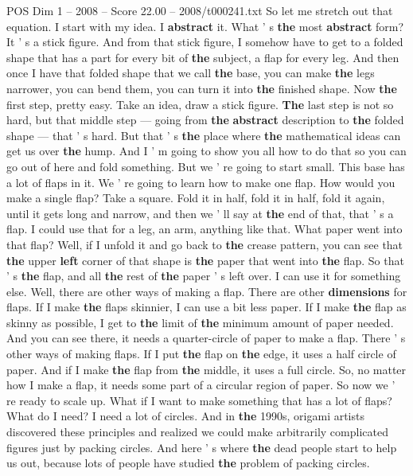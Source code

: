 \begin{textsample}{POS Dim 1 – 2008 – Score 22.00 – 2008/t000241.txt}
So let me stretch out that equation.
I start with my idea.
I \textbf{abstract} it.
What ' s \textbf{the} most \textbf{abstract} form?
It ' s a stick figure.
And from that stick figure, I somehow have to get to a folded shape that has a part for every bit of \textbf{the} subject, a flap for every leg.
And then once I have that folded shape that we call \textbf{the} base, you can make \textbf{the} legs narrower, you can bend them, you can turn it into \textbf{the} finished shape.
Now \textbf{the} first step, pretty easy.
Take an idea, draw a stick figure. \textbf{The} last step is not so hard, but that middle step — going from \textbf{the} \textbf{abstract} description to \textbf{the} folded shape — that ' s hard.
But that ' s \textbf{the} place where \textbf{the} mathematical ideas can get us over \textbf{the} hump.
And I ' m going to show you all how to do that so you can go out of here and fold something.
But we ' re going to start small.
This base has a lot of flaps in it.
We ' re going to learn how to make one flap.
How would you make a single flap?
Take a square.
Fold it in half, fold it in half, fold it again, until it gets long and narrow, and then we ' ll say at \textbf{the} end of that, that ' s a flap.
I could use that for a leg, an arm, anything like that.
What paper went into that flap?
Well, if I unfold it and go back to \textbf{the} crease pattern, you can see that \textbf{the} upper \textbf{left} corner of that shape is \textbf{the} paper that went into \textbf{the} flap.
So that ' s \textbf{the} flap, and all \textbf{the} rest of \textbf{the} paper ' s left over.
I can use it for something else.
Well, there are other ways of making a flap.
There are other \textbf{dimensions} for flaps.
If I make \textbf{the} flaps skinnier, I can use a bit less paper.
If I make \textbf{the} flap as skinny as possible, I get to \textbf{the} limit of \textbf{the} minimum amount of paper needed.
And you can see there, it needs a quarter-circle of paper to make a flap.
There ' s other ways of making flaps.
If I put \textbf{the} flap on \textbf{the} edge, it uses a half circle of paper.
And if I make \textbf{the} flap from \textbf{the} middle, it uses a full circle.
So, no matter how I make a flap, it needs some part of a circular region of paper.
So now we ' re ready to scale up.
What if I want to make something that has a lot of flaps?
What do I need?
I need a lot of circles.
And in \textbf{the} 1990s, origami artists discovered these principles and realized we could make arbitrarily complicated figures just by packing circles.
And here ' s where \textbf{the} dead people start to help us out, because lots of people have studied \textbf{the} problem of packing circles.

\end{textsample}
